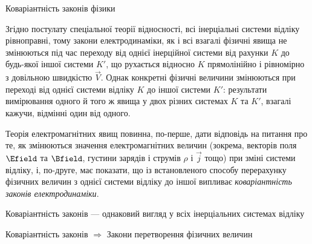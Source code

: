 \documentclass[]{beamer}
\let\vect\vec
\begin{document}
\begin{frame}{Коваріантність законів фізики}{}
	\begin{block}{}\justifying\small
		Згідно постулату спеціальної теорії відносності, всі інерціальні системи відліку рівноправні, тому закони електродинаміки, як і всі взагалі фізичні явища не змінюються під час переходу від однієї інерційної системи від рахунки $ K $ до будь-якої іншої системи $ K' $, що рухається відносно $ K $ прямолінійно і рівномірно з довільною швидкістю $ \vect{V} $. Однак конкретні фізичні величини змінюються при переході від однієї системи відліку $ K $ до іншої системи $ K' $: результати вимірювання одного й того ж явища у двох різних системах $ K $ та $ K' $, взагалі кажучи, відмінні один від одного.
	\end{block}


	\begin{block}  {}\justifying
		Теорія електромагнітних явищ повинна, по-перше, дати відповідь на питання про те, як змінюються значення електромагнітних величин (зокрема, векторів поля $ \Efield $ та $ \Bfield $, густини зарядів і струмів $ \rho $ і $ \vect{j} $ тощо) при зміні системи відліку, і, по-друге, має показати, що із встановленого способу перерахунку фізичних величин з однієї системи відліку до іншої випливає \emph{\color{blue}коваріантність законів електродинаміки}.
	\end{block}

	\begin{alertblock}{}\centering
		Коваріантність законів --- однаковий вигляд у всіх інерціальних системах відліку
	\end{alertblock}

	\begin{alertblock}{}\centering
		Коваріантність законів $ \Rightarrow $ Закони перетворення фізичних величин
	\end{alertblock}
\end{frame}
\end{document}
